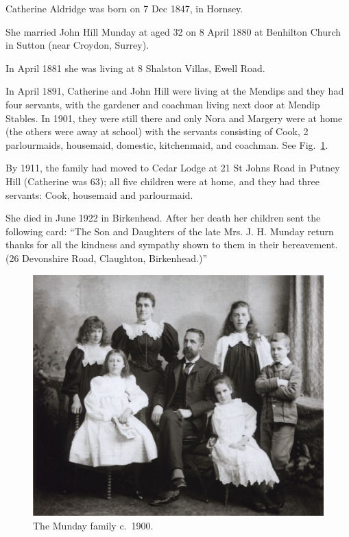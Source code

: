 
Catherine Aldridge was born on 7 Dec 1847, in Hornsey.\cite{JHMtree, 1881censusKingston}

She married John Hill Munday at aged 32 on 8 April 1880\cite{JHM-CA-marriage} at Benhilton Church in Sutton (near Croydon, Surrey).\cite{JHM-CA-marriage, JHM-CA-marriage-announcement}

In April 1881 she was living at 8 Shalston Villas, Ewell Road.\cite{1881censusKingston}

In April 1891, Catherine and John Hill were living at the Mendips and they had four servants, with the gardener and coachman living next door at Mendip Stables.\cite{1891census} In 1901, they were still there and only Nora and Margery were at home (the others were away at school) with the servants consisting of Cook, 2 parlourmaids, housemaid, domestic, kitchenmaid, and coachman.\cite{1901censusMendips} See Fig.~\ref{MundayFamilyPhoto}.

By 1911, the family had moved to Cedar Lodge at 21 St Johns Road in Putney Hill (Catherine was 63); all five children were at home, and they had three servants: Cook, housemaid and parlourmaid.\cite{1911censusWandsworth}

She died in June 1922 in Birkenhead.\cite{FreeBMD-CA} After her death her children sent the following card: ``The Son and Daughters of the late Mrs. J. H. Munday return thanks for all the kindness and sympathy shown to them in their bereavement. (26 Devonshire Road, Claughton, Birkenhead.)''\cite{CA-bereavement-card}

\begin{figure}
	\centering
	\label{MundayFamilyPhoto}
	\includegraphics{photos/Munday_family}
	\caption{The Munday family c.~1900.\cite{MundayFamilyPhoto}}
\end{figure}
